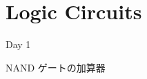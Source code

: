 \documentclass[10pt, dvipdfmx]{beamer}
\begin{document}
%
%
%
%
%
%
%
%
%
%
%
%
%
%
%
%
\section{Logic Circuits}
\begin{frame}{Day 1}
\begin{center}{\huge NAND ゲートの加算器}


\end{center}

\end{frame}
\end{document}
